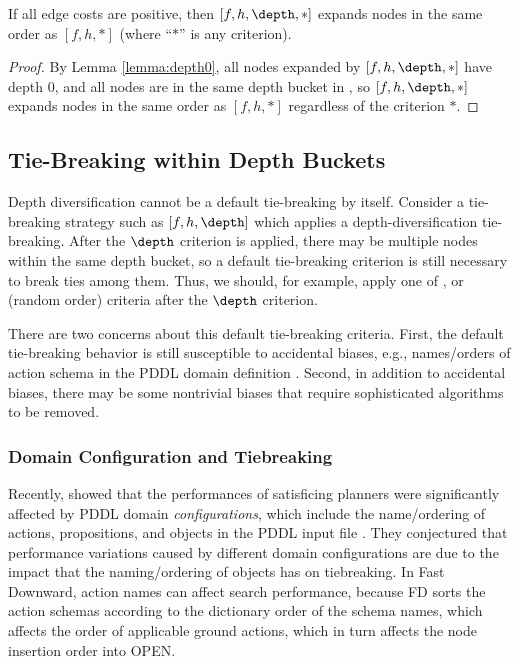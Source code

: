 \begin{theo}
  If all edge costs are positive, then \astar $[f,h,\depth,*]$ expands nodes in the same order as  \astar $[f,h,*]$ (where ``$*$'' is any criterion).
\end{theo}
\begin{proof}
  By Lemma \ref{lemma:depth0}, all nodes expanded by \astar $[f,h,\depth,*]$ have depth 0, and all nodes are in the same depth bucket in , so \astar $[f,h,\depth,*]$ expands nodes in the same order as \astar $[f,h,*]$ regardless of the criterion $*$.
\end{proof}


\subsection{Tie-Breaking within Depth Buckets}

Depth diversification cannot be a default tie-breaking by itself.
Consider a tie-breaking strategy such as $[f,h,\depth]$ which applies a depth-diversification tie-breaking.
After the $\depth$ criterion is applied, 
there may be multiple nodes within the same depth bucket, so a
default tie-breaking criterion is still necessary to break ties among them.
Thus, we should, for example, apply one of \lifo, \fifo or \ro (random order) criteria
after the $\depth$ criterion.

There are two concerns about this default tie-breaking criteria.
First, the default tie-breaking behavior is still susceptible to 
 accidental biases, e.g., names/orders of action schema in the PDDL domain definition \cite{vallati2015effective}.
Second, in addition to accidental biases, there may be some nontrivial biases that require 
sophisticated algorithms to be removed.

\subsubsection{Domain Configuration and Tiebreaking}

Recently, \citeauthor{vallati2015effective} showed that the performances of 
satisficing planners were significantly affected by PDDL domain \emph{configurations}, which include the name/ordering of actions, propositions, and objects in the PDDL input file \citeyear{vallati2015effective}.
They conjectured that performance variations caused
by different domain configurations are due to the impact that the naming/ordering of objects has on tiebreaking.
In Fast Downward, action names can affect search performance, because FD 
sorts the action schemas according to the dictionary
order of the schema names, which affects the order of applicable ground
actions, which in turn affects the node insertion order into OPEN.

